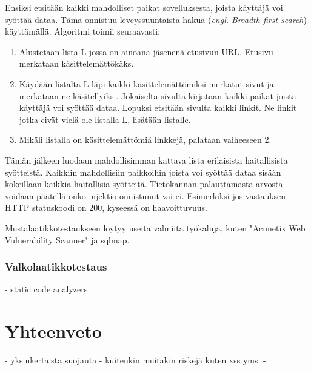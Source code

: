 \documentclass[finnish]{tktltiki2}
\theoremstyle{definition}
\theoremstyle{remark}
\begin{document}
	Ensiksi etsitään kaikki mahdolliset paikat sovelluksesta, joista käyttäjä voi syöttää dataa. Tämä onnistuu leveyssuuntaista hakua (\textit{engl. Breadth-first search}) käyttämällä. Algoritmi toimii seuraavasti:
	\begin{enumerate}
		\item Alustetaan lista L jossa on ainoana jäsenenä etusivun URL. Etusivu merkataan käsittelemättökäks.
		
		\item Käydään listalta L läpi kaikki käsittelemättömiksi merkatut sivut ja merkataan ne käsitellyiksi. Jokaiselta sivulta kirjataan kaikki paikat joista käyttäjä voi syöttää dataa. Lopuksi etsitään sivulta kaikki linkit. Ne linkit jotka eivät vielä ole listalla L, lisätään listalle.
		
		\item Mikäli listalla on käsittelemättömiä linkkejä, palataan vaiheeseen 2.
	\end{enumerate}
	
	Tämän jälkeen luodaan mahdollisimman kattava lista erilaisista haitallisista syötteistä. Kaikkiin mahdollisiin paikkoihin joista voi syöttää dataa sisään kokeillaan kaikkia haitallisia syötteitä. Tietokannan palauttamasta arvosta voidaan päätellä onko injektio onnistunut vai ei. Esimerkiksi jos vastauksen HTTP statuskoodi on 200, kyseessä on haavoittuvuus.
	
	Mustalaatikkotestaukseen löytyy useita valmiita työkaluja, kuten "Acunetix Web Vulnerability Scanner" ja sqlmap.
	
	\subsubsection{Valkolaatikkotestaus}
	- static code analyzers
	
	\pagebreak
	
	\pagebreak
	\section {Yhteenveto}
	- yksinkertaista suojauta
	- kuitenkin muitakin riskejä kuten xss yms.
	- 

	
	
	
	
	
	
	
	
	
	
	
	
\end{document}
